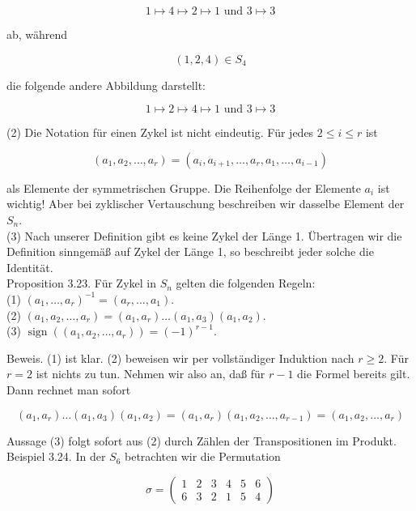 \documentclass[10pt, letterpaper]{article}
\begin{document}
$$
1 \mapsto 4 \mapsto 2 \mapsto 1 \text { und } 3 \mapsto 3
$$

ab, während

$$
(1,2,4) \in S_{4}
$$

die folgende andere Abbildung darstellt:

$$
1 \mapsto 2 \mapsto 4 \mapsto 1 \text { und } 3 \mapsto 3
$$

(2) Die Notation für einen Zykel ist nicht eindeutig. Für jedes $2 \leq i \leq r$ ist

$$
\left(a_{1}, a_{2}, \ldots, a_{r}\right)=\left(a_{i}, a_{i+1}, \ldots, a_{r}, a_{1}, \ldots, a_{i-1}\right)
$$

als Elemente der symmetrischen Gruppe. Die Reihenfolge der Elemente $a_{i}$ ist wichtig! Aber bei zyklischer Vertauschung beschreiben wir dasselbe Element der $S_{n}$.\\
(3) Nach unserer Definition gibt es keine Zykel der Länge 1. Übertragen wir die Definition sinngemäß auf Zykel der Länge 1, so beschreibt jeder solche die Identität.\\
Proposition 3.23. Für Zykel in $S_{n}$ gelten die folgenden Regeln:\\
(1) $\left(a_{1}, \ldots, a_{r}\right)^{-1}=\left(a_{r}, \ldots, a_{1}\right)$.\\
(2) $\left(a_{1}, a_{2}, \ldots, a_{r}\right)=\left(a_{1}, a_{r}\right) \ldots\left(a_{1}, a_{3}\right)\left(a_{1}, a_{2}\right)$.\\
(3) $\operatorname{sign}\left(\left(a_{1}, a_{2}, \ldots, a_{r}\right)\right)=(-1)^{r-1}$.

Beweis. (1) ist klar. (2) beweisen wir per vollständiger Induktion nach $r \geq 2$. Für $r=2$ ist nichts zu tun. Nehmen wir also an, daß für $r-1$ die Formel bereits gilt. Dann rechnet man sofort

$$
\left(a_{1}, a_{r}\right) \ldots\left(a_{1}, a_{3}\right)\left(a_{1}, a_{2}\right)=\left(a_{1}, a_{r}\right)\left(a_{1}, a_{2}, \ldots, a_{r-1}\right)=\left(a_{1}, a_{2}, \ldots, a_{r}\right)
$$

Aussage (3) folgt sofort aus (2) durch Zählen der Transpositionen im Produkt.\\
Beispiel 3.24. In der $S_{6}$ betrachten wir die Permutation

$$
\sigma=\left(\begin{array}{cccccc}
1 & 2 & 3 & 4 & 5 & 6 \\
6 & 3 & 2 & 1 & 5 & 4
\end{array}\right)
$$
\end{document}
